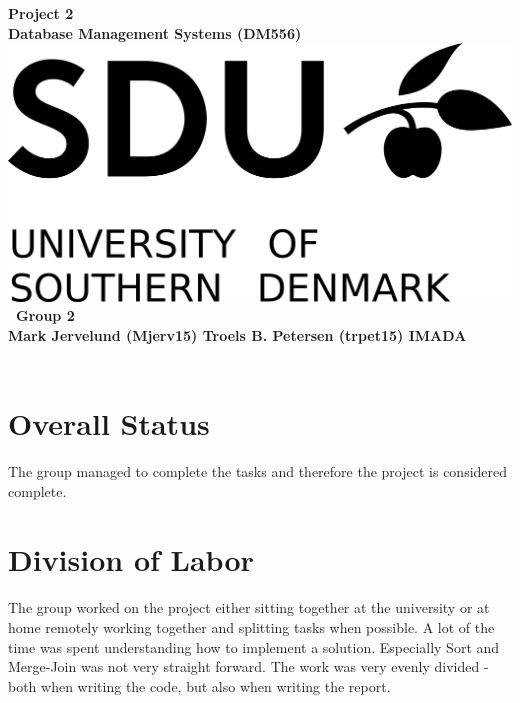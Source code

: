 \documentclass[a4paper,10pt,titlepage]{report}
\date{}
\begin{document}
\begin{titlepage}
\centering
    \vspace*{9\baselineskip}
    \huge
    \bfseries
    Project 2\\
    
    \normalfont 
	\huge    
    Database Management Systems (DM556)  \\[4\baselineskip]
    \normalfont
	\includegraphics[scale=1.5]{SDU_Logo}
    \vfill\
    Group 2\\
    Mark Jervelund (Mjerv15) Troels B. Petersen (trpet15)
    \vspace{5mm}
    IMADA \\
    \textbf{\datedate} \\[2\baselineskip]
\end{titlepage}

\setcounter{page}{1}
\renewcommand{\thepage}{\arabic{page}}

\lstset{language=Java}          %
\section{Overall Status}
The group managed to complete the tasks and therefore the project is considered complete.
\section{Division of Labor}
The group worked on the project either sitting together at the university or at home remotely working together and splitting tasks when possible. A lot of the time was spent understanding how to implement a solution. Especially Sort and Merge-Join was not very straight forward. The work was very evenly divided - both when writing the code, but also when writing the report.
\end{document}
